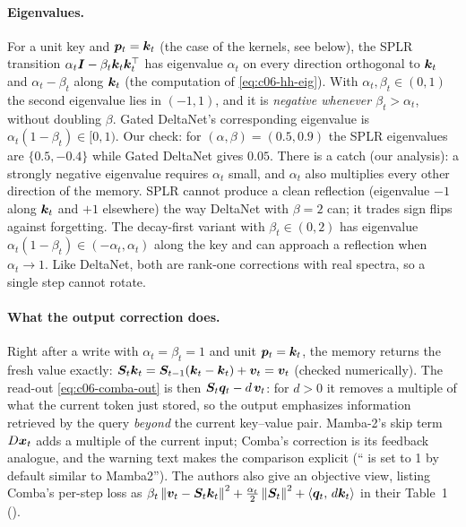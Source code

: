 \paragraph{Eigenvalues.}
For a unit key and $\bm{p}_t=\bm{k}_t$ (the case of the \fla{} kernels, see below), the SPLR
transition $\alpha_t\bm{I}-\beta_t\bm{k}_t\bm{k}_t^{\top}$ has eigenvalue $\alpha_t$ on every direction
orthogonal to $\bm{k}_t$ and $\alpha_t-\beta_t$ along $\bm{k}_t$ (the computation of
\eqref{eq:c06-hh-eig}). With $\alpha_t,\beta_t\in(0,1)$ the second eigenvalue lies in
$(-1,1)$, and it is \emph{negative whenever $\beta_t>\alpha_t$}, without doubling $\beta$.
Gated DeltaNet's corresponding eigenvalue is $\alpha_t(1-\beta_t)\in[0,1)$. Our check: for
$(\alpha,\beta)=(0.5,0.9)$ the SPLR eigenvalues are $\{0.5,-0.4\}$ while Gated DeltaNet gives
$0.05$. There is a catch (our analysis): a strongly negative eigenvalue requires
$\alpha_t$ small, and $\alpha_t$ also multiplies every other direction of the memory. SPLR
cannot produce a clean reflection (eigenvalue $-1$ along $\bm{k}_t$ and $+1$ elsewhere) the
way DeltaNet with $\beta=2$ can; it trades sign flips against forgetting. The decay-first
variant with $\beta_t\in(0,2)$ has eigenvalue $\alpha_t(1-\beta_t)\in(-\alpha_t,\alpha_t)$
along the key and can approach a reflection when $\alpha_t\to1$. Like DeltaNet, both are
rank-one corrections with real spectra, so a single step cannot rotate.

\paragraph{What the output correction does.}
Right after a write with $\alpha_t=\beta_t=1$ and unit $\bm{p}_t=\bm{k}_t$, the memory returns the
fresh value exactly: $\bm{S}_t\bm{k}_t=\bm{S}_{t-1}(\bm{k}_t-\bm{k}_t)+\bm{v}_t=\bm{v}_t$ (checked numerically).
The read-out \eqref{eq:c06-comba-out} is then $\bm{S}_t\bm{q}_t-d\,\bm{v}_t$: for $d>0$ it removes a
multiple of what the current token just stored, so the output emphasizes information
retrieved by the query \emph{beyond} the current key--value pair. Mamba-2's skip term
$D\bm{x}_t$ adds a multiple of the current input; Comba's correction is its feedback analogue,
and the \fla{} warning text makes the comparison explicit (`` is set
to 1 by default similar to Mamba2''). The authors also give an objective view, listing
Comba's per-step loss as
$\beta_t\left\lVert \bm{v}_t-\bm{S}_t\bm{k}_t\right\rVert^2+\frac{\alpha_t}{2}\left\lVert \bm{S}_t\right\rVert^2+\left\langle \bm{q}_t,\, d\bm{k}_t\right\rangle$
in their Table~1 ().

